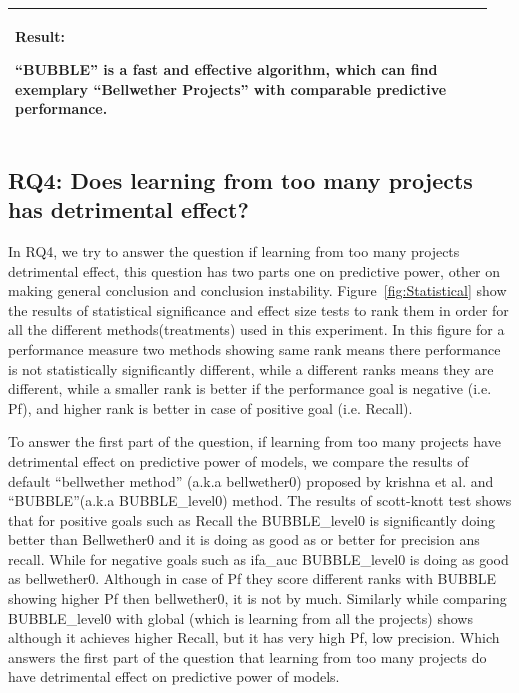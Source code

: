 \documentclass[10pt,journal,compsoc]{IEEEtran}
\newenvironment{result}
{\vspace{0.15cm}
\noindent\begin{minipage}{\linewidth}
\begin{center}
\arrayrulecolor{lightergray}
\begin{tabular}{|p{0.95\linewidth}|}
\hline%
\rowcolor{lightergray}%
\textbf{Result:}~%
}
{\\\hline
\end{tabular}
\end{center}
\end{minipage}
\vspace{0.15cm}
}
\begin{document}
\begin{result}
{``BUBBLE'' is a fast and effective algorithm, which can find exemplary ``Bellwether Projects'' with comparable predictive performance.}
\end{result}




\subsection*{RQ4: Does learning from too many projects has detrimental effect?}
\label{sec:rq4}
In RQ4, we try to answer the question if learning from too many projects detrimental effect, this question has two parts one on predictive power, other on making general conclusion and conclusion instability. Figure~\ref{fig:Statistical} show the results of statistical significance and effect size tests to rank them in order for all the different methods(treatments) used in this experiment. In this figure for a performance measure two methods showing same rank means there performance is not statistically significantly different, while a different ranks means they are different, while a smaller rank is better if the performance goal is negative (i.e. Pf), and higher rank is better in case of positive goal (i.e. Recall).

To answer the first part of the question, if learning from too many projects have detrimental effect on predictive power of models, we compare the results of default ``bellwether method'' (a.k.a bellwether0) proposed by krishna et al. and ``BUBBLE''(a.k.a BUBBLE\_level0) method. The results of scott-knott test shows that for positive goals such as Recall the BUBBLE\_level0 is significantly doing better than Bellwether0 and it is doing as good as or better for precision ans recall. While for negative goals such as ifa\_auc BUBBLE\_level0 is doing as good as bellwether0. Although in case of Pf they score different ranks with BUBBLE showing higher Pf then bellwether0, it is not by much. Similarly while comparing BUBBLE\_level0 with global (which is learning from all the projects) shows although it achieves higher Recall, but it has very high Pf, low precision. Which answers the first part of the question that learning from too many projects do have detrimental effect on predictive power of models. 
\end{document}
